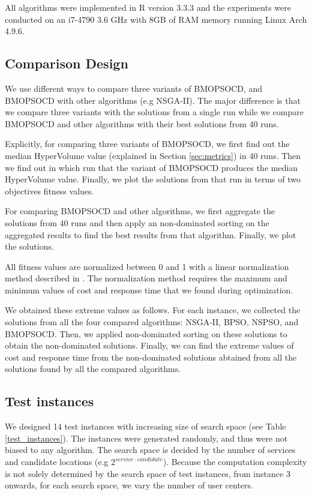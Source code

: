 \documentclass[10pt,journal,compsoc]{IEEEtran}
\begin{document}
All algorithms were implemented in R version 3.3.3 and the experiments were conducted on an i7-4790 3.6 GHz with 8GB of RAM memory running Linux Arch 4.9.6.
\subsection{Comparison Design}
We use different ways to compare three variants of BMOPSOCD, and BMOPSOCD with other algorithms (e.g NSGA-II). The major difference is that we compare three variants with the solutions from a single run while we compare BMOPSOCD and other algorithms with their best solutions from 40 runs.

Explicitly, for comparing three variants of BMOPSOCD, we first find out the median HyperVolume value (explained in Section \ref{sec:metrics}) in 40 runs. Then we find out in which run that the variant of BMOPSOCD produces the median HyperVolume value. Finally, we plot the solutions from that run in terms of two objectives fitness values.

For comparing BMOPSOCD and other algorithms, we first aggregate the solutions from 40 runs and then apply an non-dominated sorting on the aggregated results to find the best results from that algorithm. Finally, we plot the solutions. 

All fitness values are normalized between 0 and 1 with a linear normalization method described in \cite{Tan2016}. 
The normalization method requires the maximum and minimum values of cost and response time 
that we found during optimization. 

We obtained these extreme values as follows. For each instance, we collected the solutions from all the four compared algorithms: NSGA-II, BPSO, NSPSO, and BMOPSOCD. Then, we applied non-dominated sorting on these solutions to obtain the non-dominated solutions. Finally, we can find the extreme values of cost and response time from the non-dominated solutions abtained from all the solutions found by all the compared algorithms.

\subsection{Test instances}
\label{sec:datasets}





We designed 14 test instances with increasing size of search space (see Table \ref{test_instances}). The instances were generated randomly, and thus were not biased to any algorithm. The search space is decided by the number of services and candidate locations (e.g $2^{service \cdot candidate}$). Because the computation complexity is not solely determined by the search space of test instances, from instance 3 onwards, for each search space, we vary the number of user centers. 
\end{document}
